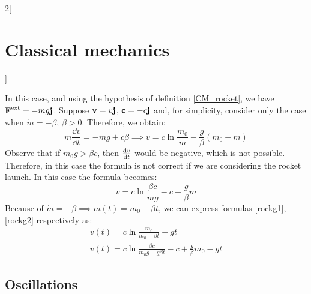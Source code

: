 \documentclass[../../../main.tex]{subfiles}
\begin{document}
\begin{multicols}{2}[\section{Classical mechanics}]
\begin{prop}
  \end{prop}
  \begin{prop}
    In this case, and using the hypothesis of definition \ref{CM_rocket}, we have $\boldsymbol{\mathrm{F}}^\text{ext}=-mg\boldsymbol{\mathrm{j}}$. Suppose $\boldsymbol{\mathrm{v}}=v\boldsymbol{\mathrm{j}}$, $\boldsymbol{\mathrm{c}}=-c\boldsymbol{\mathrm{j}}$ and, for simplicity, consider only the case when $\dot{m}=-\beta$, $\beta>0$. Therefore, we obtain:
    \begin{equation}
      m\frac{\dd v}{\dd t}=-mg+c\beta\implies v=c\ln\frac{m_0}{m}-\frac{g}{\beta}(m_0-m)
      \label{rockg1}
    \end{equation}
    Observe that if $m_0g>\beta c$, then $\dv{v}{t}$ would be negative, which is not possible. Therefore, in this case the formula is not correct if we are considering the rocket launch. In this case the formula becomes:
    \begin{equation}
      v=c\ln\frac{\beta c}{mg}-c+\frac{g}{\beta}m
      \label{rockg2}
    \end{equation}
    Because of $\dot{m}=-\beta\implies m(t)=m_0-\beta t$, we can express formulas \eqref{rockg1}, \eqref{rockg2} respectively as:
    \begin{gather*}
      v(t)=c\ln\frac{m_0}{m_0-\beta t}-gt\\
      v(t)=c\ln\frac{\beta c}{m_0g-g\beta t}-c+\frac{g}{\beta}m_0-gt
    \end{gather*}
  \end{prop}
  \subsection{Oscillations}

\end{multicols}
\end{document}
